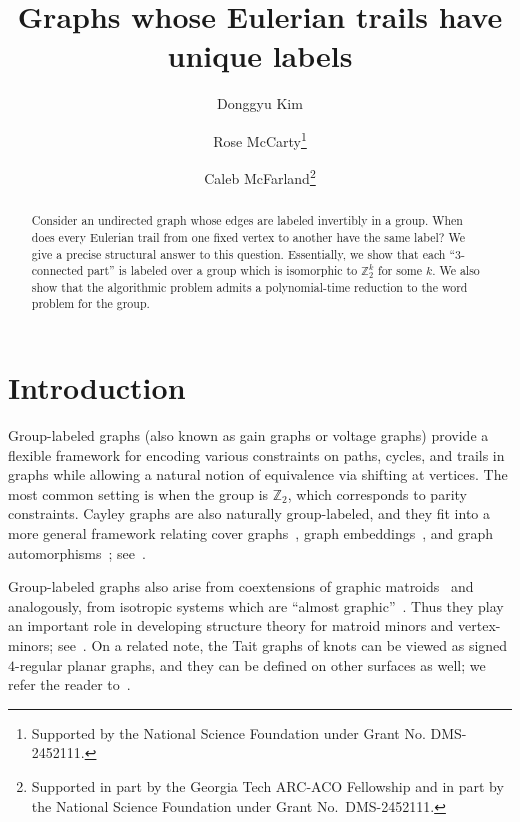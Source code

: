 \documentclass[a4paper, 12pt]{article}
\title{Graphs whose Eulerian trails have unique labels}
\author{Donggyu Kim}
\affil[1,3]{School of Mathematics, Georgia Institute of Technology.}
\author{Rose McCarty\thanks{Supported by the National Science Foundation under Grant No. DMS-2452111.}}
\affil{School of Mathematics and School of Computer Science, Georgia Institute of Technology.}
\author{Caleb McFarland\thanks{Supported in part by the Georgia Tech ARC-ACO Fellowship and in part by the National Science Foundation under Grant No.~DMS-2452111.}}
\newcommand{\RMM}[1]{\textcolor{orange}{RM: #1}}
\begin{document}
\maketitle

\begin{abstract}
    Consider an undirected graph whose edges are labeled invertibly in a group. When does every Eulerian trail from one fixed vertex to another have the same label? We give a precise structural answer to this question. Essentially, we show that each ``$3$-connected part'' is labeled over a group which is isomorphic to $\mathbb{Z}_2^k$ for some $k$. We also show that the algorithmic problem admits a polynomial-time reduction to the word problem for the group. 
\end{abstract}



\section{Introduction}
Group-labeled graphs (also known as gain graphs or voltage graphs) provide a flexible framework for encoding various constraints on paths, cycles, and trails in graphs while allowing a natural notion of equivalence via shifting at vertices. The most common setting is when the group is $\mathbb{Z}_2$, which corresponds to parity constraints. Cayley graphs are also naturally group-labeled, and they fit into a more general framework relating cover graphs~\cite{GrossTucker77}, graph embeddings~\cite{Gross74}, and graph automorphisms~\cite{CayleyVoltageDegreeDiam}; see~\cite{GrossTucker01}. 

Group-labeled graphs also arise from coextensions of graphic matroids~\cite{GerardsGraphicMatroids, ZaslavskyMatroids1} and analogously, from isotropic systems which are ``almost graphic''~\cite{graphicIsoSystems, BouchetCircleChar}. Thus they play an important role in developing structure theory for matroid minors and vertex-minors; see~\cite{GGW14, McCartyThesis}. On a related note, the Tait graphs of knots can be viewed as signed $4$-regular planar graphs, and they can be defined on other surfaces as well; we refer the reader to~\cite{BouchetMap, EllisMonaghanMoffattTwistedDuality, Moffat12}.


\end{document}
